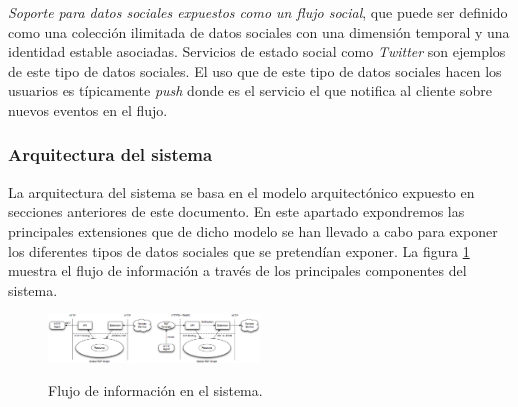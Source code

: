 \begin{itemize}
\textit{Soporte para datos sociales expuestos como un flujo social}, que puede ser definido como una colecci\'on ilimitada de datos sociales con una dimensi\'on temporal y una identidad estable asociadas. Servicios de estado social como \textit{Twitter} son ejemplos de este tipo de datos sociales. El uso que de este tipo de datos sociales hacen los usuarios es t\'ipicamente \textit{push} donde es el servicio el que notifica al cliente sobre nuevos eventos en el flujo. 
\end{itemize}

\subsubsection{Arquitectura del sistema}

La arquitectura del sistema se basa en el modelo arquitect\'onico expuesto en secciones anteriores de este documento. En este apartado expondremos las principales extensiones que de dicho modelo se han llevado a cabo para exponer los diferentes tipos de datos sociales que se pretend\'ian exponer. La figura \ref{figura5} muestra el flujo de informaci\'on a trav\'es de los principales componentes del sistema.\\

\begin{figure}
\vspace{2.4in}
\caption{Flujo de informaci\'on en el sistema.}
\includegraphics[width=0.5\textwidth]{figura5}
\label{figura5}
\end{figure}


